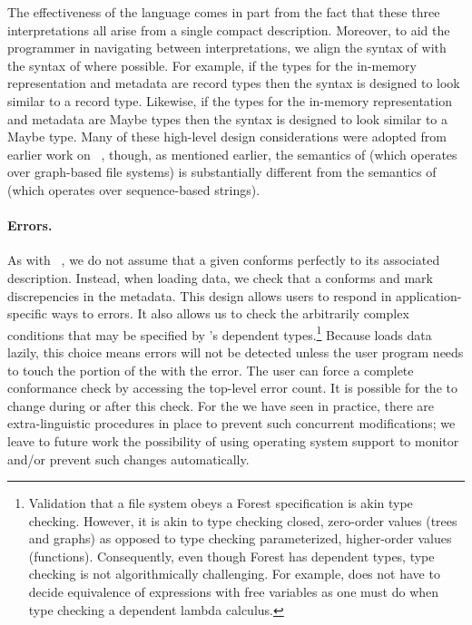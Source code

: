 The effectiveness of the \forest{} language comes in part from the fact 
that these three interpretations all arise from a single compact description.  
Moreover, to aid the programmer in navigating between interpretations, we
align the syntax of \forest{} with the syntax of \haskell{} where possible.
For example, if the \haskell{} types for the in-memory representation and
metadata are record types then the \forest{} syntax is designed to look similar
to a \haskell{} record type.  Likewise,  if the \haskell{} types for the in-memory representation and
metadata are Maybe types then the \forest{} syntax is designed to look similar
to a \haskell{} Maybe type.  
Many of these high-level design considerations were adopted
from earlier work on 
\pads{}~\cite{fisher+:pads,fisher+:toplas,mandelbaum+:pads-ml}, though, 
as mentioned earlier,
the semantics of \forest{} (which operates over graph-based file systems)
is substantially different from the semantics
of \pads{} (which operates over sequence-based strings).

\paragraph{Errors.}
As with
\pads{}~\cite{fisher+:pads,fisher+:toplas,mandelbaum+:pads-ml}, we do
not assume that a given \filestore{} conforms perfectly to its associated
\forest{} description.  Instead, when loading data, we check that a 
\filestore{} conforms and mark discrepencies
in the metadata.  This design allows users to respond in
application-specific ways to errors.  It also allows us to check
the arbitrarily complex conditions that may be specified by 
\forest{}'s dependent types.\footnote{Validation that a file
system obeys a Forest specification is akin type checking.  However,
it is akin to type checking closed, zero-order values (trees and graphs)
as opposed to type checking parameterized, higher-order values (functions).
Consequently, even though Forest has dependent types, type checking 
is not algorithmically challenging.  For example, \forest{} does not
have to decide equivalence of expressions with free variables as one  
must do when type checking a dependent lambda calculus.}  
Because \forest{} loads data
lazily, this choice means errors will not be detected unless the user
program needs to touch the portion of the \filestore{} with the
error. The user can force a complete conformance check by accessing
the top-level error count.  It is possible for the
\filestore{} to change during or after this check.  For the
\filestores{} we have seen in practice, there are
extra-linguistic procedures in place to prevent such concurrent
modifications; we leave to future work the possibility of 
using operating system support to monitor and/or prevent
such changes automatically. 

